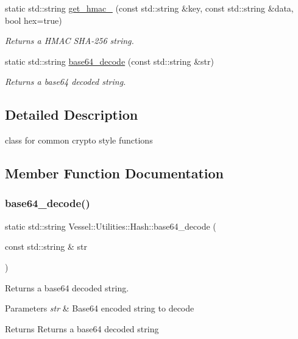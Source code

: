 \begin{DoxyCompactItemize}
static std\+::string \hyperlink{class_vessel_1_1_utilities_1_1_hash_af263070a887f314a5ea27316258a87ac}{get\+\_\+hmac\+\_} (const std\+::string \&key, const std\+::string \&data, bool hex=true)
\begin{DoxyCompactList}\small\item\em Returns a H\+M\+AC S\+H\+A-\/256 string. \end{DoxyCompactList}\item 
static std\+::string \hyperlink{class_vessel_1_1_utilities_1_1_hash_a0e1b698d8ab1aea9f1d7a47789e055ea}{base64\+\_\+decode} (const std\+::string \&str)
\begin{DoxyCompactList}\small\item\em Returns a base64 decoded string. \end{DoxyCompactList}\end{DoxyCompactItemize}


\subsection{Detailed Description}
class for common crypto style functions 

\subsection{Member Function Documentation}
\mbox{\label{class_vessel_1_1_utilities_1_1_hash_a0e1b698d8ab1aea9f1d7a47789e055ea}} 
\subsubsection{\texorpdfstring{base64\+\_\+decode()}{base64\_decode()}}
{\footnotesize\ttfamily static std\+::string Vessel\+::\+Utilities\+::\+Hash\+::base64\+\_\+decode (\begin{DoxyParamCaption}\item[{const std\+::string \&}]{str }\end{DoxyParamCaption})\hspace{0.3cm}{\ttfamily [static]}}



Returns a base64 decoded string. 


\begin{DoxyParams}{Parameters}
{\em str} & Base64 encoded string to decode \\
\hline
\end{DoxyParams}
\begin{DoxyReturn}{Returns}
Returns a base64 decoded string 
\end{DoxyReturn}
\mbox{\label{class_vessel_1_1_utilities_1_1_hash_ae618a6d2856efcf77399aab0dc8d7848}} 
